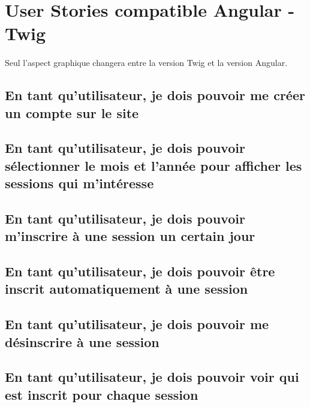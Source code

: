 \section{User Stories compatible Angular - Twig}
	\paragraph{}
		Seul l'aspect graphique changera entre la version Twig et la version Angular. 
	
	\subsection{En tant qu’utilisateur, je dois pouvoir me créer un compte sur le site}
		

	\vspace{\baselineskip}
	\subsection{En tant qu'utilisateur, je dois pouvoir sélectionner le mois et l'année pour afficher les sessions qui m'intéresse}
		
	
	\vspace{\baselineskip}
	\subsection{En tant qu’utilisateur, je dois pouvoir m’inscrire à une session un certain jour}
		

	\newpage
	\subsection{En tant qu’utilisateur, je dois pouvoir être inscrit automatiquement à une session}
		
	
	\newpage
	\subsection{En tant qu’utilisateur, je dois pouvoir me désinscrire à une session}
		

	\vspace{\baselineskip}
	\subsection{En tant qu’utilisateur, je dois pouvoir voir qui est inscrit pour chaque session}
		
	
